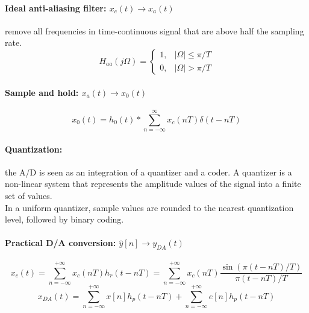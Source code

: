 \paragraph{Ideal anti-aliasing filter: $x_{c}(t) \to x_{a}(t)$} remove all frequencies in time-continuous signal that are above half the sampling rate.
\[
    H_{aa}(j\Omega) = 
    \begin{cases}
    1,  & \lvert \Omega \rvert \leq \pi/T \\
    0,  & \lvert \Omega \rvert > \pi/T
    \end{cases}
\]

\paragraph{Sample and hold: $x_{a}(t) \to x_{0}(t)$}
\[
    x_0(t) = h_0(t) * \sum_{n=-\infty}^{\infty} x_{c}(nT)\delta(t-nT)
\]

\paragraph{Quantization:} the A/D is seen as an integration of a quantizer and a coder. A quantizer is a non-linear system that represents the 
amplitude values of the signal into a finite set of values. \\

In a uniform quantizer, sample values are rounded to the nearest quantization level, followed by binary 
coding.

\paragraph{Practical D/A conversion: $\hat{y}[n] \to y_{DA}(t)$}
\[
    x_{c}(t) = \sum_{n=-\infty}^{+\infty} x_{c}(nT)h_{r}(t-nT) = \sum_{n=-\infty}^{+\infty} x_{c}(nT) \frac{\sin(\pi(t-nT)/T)}{\pi(t-nT)/T}
\]
\[
    x_{DA}(t) = \sum_{n=-\infty}^{+\infty} x[n]h_{p}(t-nT) + \sum_{n=-\infty}^{+\infty} e[n]h_{p}(t-nT)
\]


